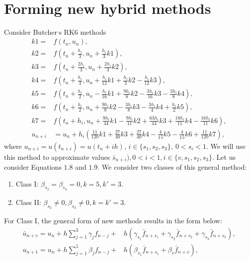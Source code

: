 ‎\documentclass[a4paper,10pt]{article}‎
\begin{document}
\section{\textbf{Forming  new hybrid methods} }\label{s2}
Consider Butcher$^{,}$s RK6 methods \cite{WBRk_6}
\begin{align}
    k1=& f(t_{n},u_{n}),\\\nonumber
    k2=& f(t_{n}+\frac{h_{i}}{3},u_{n}+\frac{h_{i}}{3}k1),\\\nonumber
    k3=& f(t_{n}+\frac{2h_{i}}{3},u_{n}+\frac{2h_{i}}{3}k2), \\\nonumber
    k4=& f(t_{n}+\frac{h_{i}}{3},u_{n}+\frac{h_{i}}{12}k1+\frac{h_{i}}{3}k2-\frac{h_{i}}{12}k3), \\\nonumber      
    k5=& f(t_{n}+\frac{h_{i}}{2},u_{n}-\frac{h_{i}}{16}k1+\frac{9h_{i}}{8}k2-\frac{3h_{i}}{16}k3-\frac{3h_{i}}{8}k4),\\\nonumber   
    k6=&  f(t_{n}+\frac{h_{i}}{2},u_{n}+\frac{9h_{i}}{8}k2-\frac{3h_{i}}{8}k3-\frac{3h_{i}}{4}k4+\frac{h_{i}}{2}k5), \\\nonumber
    k7=& f(t_{n}+h_{i},u_{n}+\frac{9h_{i}}{44}k1-\frac{9h_{i}}{11}k2+\frac{63h_{i}}{44}k3+\frac{18h_{i}}{11}k4-\frac{16h_{i}}{11}k6),\\\nonumber
    u_{n+i}&=u_{n}+h_{i}(\frac{11}{120}k1+\frac{27}{40}k3+\frac{27}{40}k4-\frac{4}{15}k5-\frac{4}{15}k6+\frac{11}{120}k7),
\end{align}
where
 $ u_{n+i}=u(t_{n+i})=u(t_{n}+ih),\,i\in \{s_{1},s_{2},s_{3}\},\ 0<s_{i}<1. $
 We will use this method to approximate values $ \bar{s}_{n+i}), 0<i<1, i\in \{v, s_{1}, s_{2}, s_{3}\}.$
\noindent
Let us consider Equations $1.8$ and $1.9$. We consider two classes of this general method:
\begin{enumerate}
\item Class I:  $\beta_{s_{2}}=\beta_{s_{3}}=0, k=5,k'=3.$ 
\item Class II: $\beta_{s_{2}}\neq 0, \beta_{s_{3}}\neq 0, k=k'=3.$ 
\end{enumerate}
For Class I, the general form of new methods results in the form below:
\begin{align}
 \bar{u}_{n+v}=u_{n}+h\sum_{j=1}^{3}\gamma_{j}f_{n-j}+ &  h(\gamma_{s_{1}}\bar{f}_{n+s_{1}}+\gamma_{s_{2}}\bar{f}_{n+s_{2}}+\gamma_{s_{3}}\bar{f}_{n+s_{3}}), \label{2.2}\\
u_{n+1}=u_{n}+h\sum_{j=1}^{5}\beta_{j}f_{n-j}+ &  h(\beta_{s_{1}}\bar{f}_{n+s_{1}}+\beta_{v}\bar{f}_{n+v}), \label{2.3}
\end{align}
\end{document}
